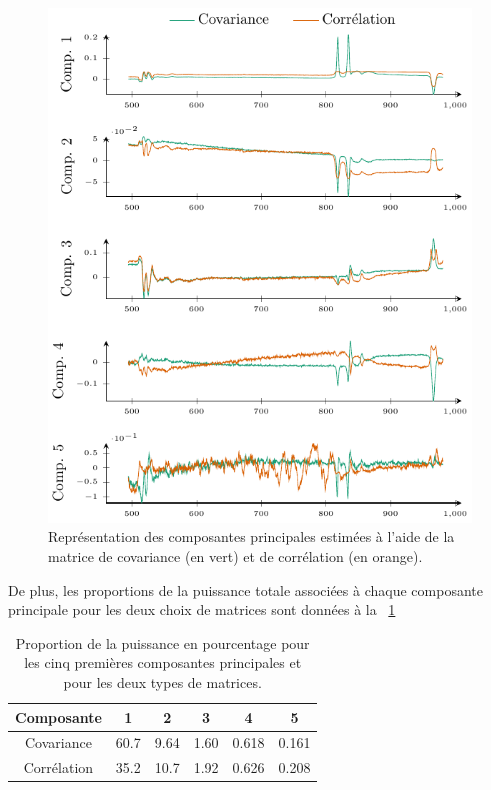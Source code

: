         \begin{figure}[t]
            \centering
            \includegraphics{img/chapitre1/figure16/centerd_spectra_comp.pdf}
            \caption{Représentation des composantes principales estimées à l'aide de la matrice de covariance (en vert) et de corrélation (en orange).
                \protect\label{fig-pca-comps_matrices}}
        \end{figure}
        De plus, les proportions de la puissance totale associées à chaque composante principale pour les deux choix de matrices sont données à la \tabname~\ref{tab-pca-comps_percentage}
        \begin{table}
            \centering
            \begin{tabular}{cccccc}
                \toprule
                Composante&1&2&3&4&5\\
                \midrule
                Covariance & 60.7 & 9.64 & 1.60 & 0.618 & 0.161\\
                Corrélation& 35.2 & 10.7 & 1.92 & 0.626 & 0.208\\
                \bottomrule
            \end{tabular}
        \vspace{1em}
        \caption{Proportion de la puissance en pourcentage pour les cinq premières composantes principales et pour les deux types de matrices.
                \protect\label{tab-pca-comps_percentage}}
        \end{table}

